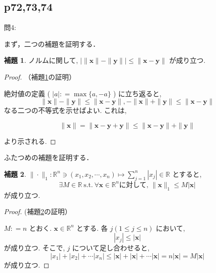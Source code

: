 \documentclass[dvipdfmx,uplatex,11pt]{jsarticle}
\theoremstyle{definition}
\newtheorem{lemm}{補題}[section]
\begin{document}
\subsection{p72,73,74}
問4:\par 
まず，二つの補題を証明する．\\
\begin{lemm}
	\label{p72:問4.1}
	ノルムに関して, $| \| \bm x  \|- \| \bm y \| | \leq \| \bm x - \bm y \|$ が成り立つ. 
\end{lemm}
\begin{proof} （補題\ref{p72:問4.1}の証明）\par 
	絶対値の定義 ( $| a | : = \max \{ a , -a \}$ ) に立ち返ると, 
%		
		\[
			\| \bm x  \|- \| \bm y \| \leq \| \bm x - \bm y \| , - \| \bm x  \| + \| \bm y \| \leq \| \bm x - \bm y \|
		\]
%		
	なる二つの不等式を示せばよい. これは, 
		
		\[
			\| \bm x \| = \| \bm x - \bm y + \bm y \| \leq \| \bm x - \bm y \| + \| \bm y \|
		\]
		
	より示される.
\end{proof}
ふたつめの補題を証明する．
\begin{lemm}
	\label{p72:問4.2}
	$\| \cdot \|_1 : \mathbb R^n \ni ( x_1 , x_2 , \cdots , x_n ) \mapsto \sum_{j=1} ^ n |x_j| \in \mathbb R$ とすると, 
%		
		\[
			\exists M \in \mathbb R \ \mathrm{s.t.} \ \forall \bm x \in \mathbb R^n \text {に対して, } \| \bm x \|_1 \leq M | \bm x | 
		\]
%		
	が成り立つ. 
\end{lemm}
\begin{proof} (補題\ref{p72:問4.2}の証明）\par 
	
	$M : = n$ とおく. $\bm x \in \mathbb R^n$ とする. 各 $j ( 1 \leq j \leq n )$ において, 
%		
		\[
			| x_j | \leq | \bm x |
		\]
%		
	が成り立つ. そこで, $j$ について足し合わせると, 
%		
		\[
			| x_1 | + | x_2 | + \cdots | x_n | \leq | \bm x | + | \bm x | + \cdots | \bm x | = n | \bm x | = M | \bm x | 
		\]
%		
	が成り立つ. 
\end{proof}
\dotfill
\end{document}
